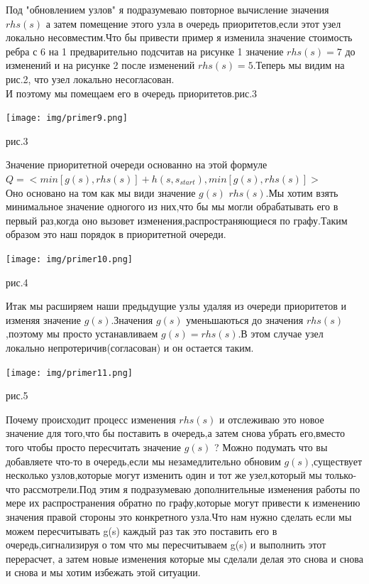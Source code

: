 \documentclass[12pt]{article}
\begin{document}
Под "обновлением узлов" я подразумеваю повторное вычисление значения $rhs(s)$ а затем помещение этого узла в очередь приоритетов,если этот узел локально несовместим.Что бы привести пример я изменила значение стоимость ребра с 6 на 1 предварительно подсчитав на рисунке 1 значение $rhs(s)=7$ до изменений и на рисунке 2 после изменений $rhs(s)=5$.Теперь мы видим на рис.2, что узел локально несогласован.\\
И поэтому мы помещаем его в очередь приоритетов.рис.3
\begin{center}
        \texttt{[image: img/primer9.png]}
        \caption{рис.3}
\end{center}
Значение приоритетной очереди основанно на этой формуле\\
$Q = <min[g(s),rhs(s)]+h(s,s_{start}),min[g(s),rhs(s)]>$\\
Оно основано на том как мы види значение $g(s)$ $rhs(s)$.Мы хотим взять минимальное значение одногого из них,что бы мы могли обрабатывать его в первый раз,когда оно вызовет изменения,распространяющиеся по графу.Таким образом это наш порядок в приоритетной очереди.
\begin{center}
        \texttt{[image: img/primer10.png]}
        \caption{рис.4}
\end{center}
Итак мы расширяем наши предыдущие узлы удаляя из очереди приоритетов и изменяя значение $g(s)$.Значения $g(s)$ уменьшаються до значения $rhs(s)$,поэтому мы просто устанавливаем $g(s)=rhs(s)$.В этом случае узел локально непротеричив(согласован) и он остается таким.
\begin{center}
        \texttt{[image: img/primer11.png]}
        \caption{рис.5}
\end{center}
Почему происходит процесс изменения $rhs(s)$ и отслеживаю это новое значение для того,что бы поставить в очередь,а затем снова убрать его,вместо того чтобы просто пересчитать значение $g(s)$ ? Можно подумать что вы добавляете что-то в очередь,если мы незамедлительно обновим $g(s)$,существует несколько узлов,которые могут изменить один и тот же узел,который мы только-что рассмотрели.Под этим я подразумеваю дополнительные изменения работы по мере их распространения обратно по графу,которые могут привести к изменению значения правой стороны это конкретного узла.Что нам нужно сделать если мы можем пересчитывать g(s) каждый раз так это поставить его в очередь,сигнализируя о том что мы пересчитываем g(s) и выполнить этот перерасчет, а затем новые изменения которые мы сделали делая это снова и снова и снова и мы хотим избежать этой ситуации.\\
\end{document}

